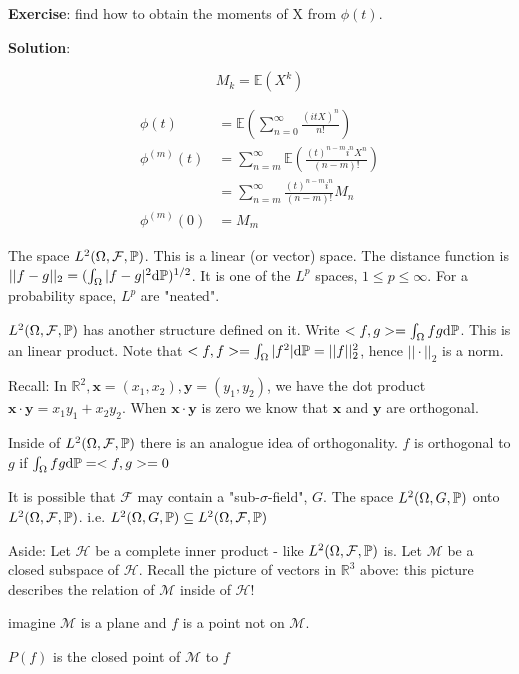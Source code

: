 \bigskip

\textbf{Exercise}: find how to obtain the moments of X from $\phi(t)$.

\textbf{Solution}:

$$
M_k=\mathbb{E}(X^k)
$$

\begin{align*}
\phi(t)&=\mathbb{E}(\sum_{n=0}^\infty \frac{(itX)^n}{n!})
\\
\phi^{(m)}(t)
&=\sum_{n=m}^\infty \mathbb{E}(\frac{(t)^{n-m}i^nX^n}{(n-m)!})
\\
&=\sum_{n=m}^\infty  \frac{(t)^{n-m}i^n}{(n-m)!}  M_n
\\
\phi^{(m)}(0)&=M_m
\end{align*}

The space $L^2(\Omega,\mathcal{F},\mathbb{P})$. This is a linear (or vector) space. The distance function  is $||f-g||_2=(\int_\Omega|f-g|^2\text{d}\mathbb{P})^{1/2}$. It is one of the $L^p$ spaces, $1\leq p\leq\infty$. For a probability space, $L^p$ are "neated".

$L^2(\Omega,\mathcal{F},\mathbb{P})$ has another structure defined on it. Write $<f,g>=\int_\Omega fg \text{d}\mathbb{P}$. This is an linear product. Note that $<f,f>=\int_\Omega |f^2|\text{d}\mathbb{P}=||f||_2^2$, hence $||\cdot||_2$ is a norm.

Recall: In $\mathbb{R}^2, \mathbf{x}=(x_1,x_2), \mathbf{y}=(y_1,y_2)$, we have the dot product $\mathbf{x}\cdot\mathbf{y}=x_1y_1+x_2y_2$. When $\mathbf{x}\cdot\mathbf{y}$ is zero we know that $\mathbf{x}$ and $\mathbf{y}$ are orthogonal.

Inside of $L^2(\Omega,\mathcal{F},\mathbb{P})$ there is an analogue idea of orthogonality. $f$ is orthogonal to $g$ if $\int_\Omega fg\text{d}\mathbb{P}=<f,g>=0$

It is possible that $\mathcal{F}$ may contain a "sub-$\sigma$-field", $G$. The space $L^2(\Omega,G,\mathbb{P})$ onto $L^2(\Omega, \mathcal{F},\mathbb{P})$. i.e. $L^2(\Omega,G,\mathbb{P}) \subseteq L^2 (\Omega, \mathcal{F},\mathbb{P})$ 

Aside: Let $\mathcal{H}$ be a complete inner product - like $L^2(\Omega,\mathcal{F},\mathbb{P})$ is. Let $\mathcal{M}$ be a closed subspace of $\mathcal{H}$. Recall the picture of vectors in $\mathbb{R}^3$ above: this picture describes the relation of $\mathcal{M}$ inside of $\mathcal{H}$!

imagine $\mathcal{M}$ is a plane and $f$ is a point not on $\mathcal{M}$.

$P(f)$ is the closed point of $\mathcal{M}$ to $f$

